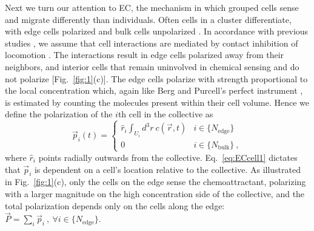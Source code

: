 Next we turn our attention to EC, the mechanism in which grouped cells sense and migrate differently than individuals.
Often cells in a cluster differentiate, with edge cells polarized and bulk cells unpolarized \cite{malet2015collective,cai2016modeling}. In accordance with previous studies \cite{camley2016emergent,varennes2016collective},
we assume that cell interactions are mediated by contact inhibition of locomotion \cite{mayor2010keeping}. The interactions result in edge cells polarized away from their neighbors, and interior cells that remain uninvolved in chemical sensing and do not polarize [Fig.\ \ref{fig:1}(c)]. The edge cells polarize with strength proportional to the local concentration which, again like Berg and Purcell's perfect instrument \cite{berg1977physics}, is estimated by counting the molecules present within their cell volume. Hence we define the polarization of the $i$th cell in the collective as
\begin{equation} \label{eq:ECcell1}
    \vec{p}_i(t) =
    \begin{cases}
         \hat{r}_i \int_{U_i} d^3r \ c(\vec{r},t) &i \in \{ N_\text{edge} \} \\
        0 &i \in \{ N_\text{bulk} \} \ ,
    \end{cases}
\end{equation}
where $\hat{r}_i$ points radially outwards from the collective. Eq.\ \ref{eq:ECcell1} dictates that $\vec{p}_i$ is dependent on a cell's location relative to the collective. As illustrated in Fig.\ \ref{fig:1}(c), only the cells on the edge sense the chemoattractant, polarizing with a larger magnitude on the high concentration side of the collective, and the total polarization depends only on the cells along the edge:
$\vec{P} = \sum_i \vec{p}_i \ , \ \forall i \in \{N_\text{edge}\}$.

